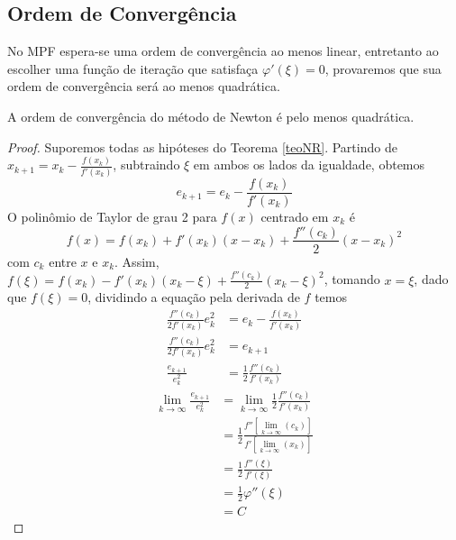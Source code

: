 \subsection{Ordem de Convergência}
No MPF espera-se uma ordem de convergência ao menos linear, entretanto ao escolher uma função de iteração que satisfaça $\varphi'(\xi) = 0$, provaremos que sua ordem de convergência será ao menos quadrática.
\begin{prop}
    A ordem de convergência do método de Newton é pelo menos quadrática.
\end{prop}
\begin{proof}
    Suporemos todas as hipóteses do Teorema \ref{teoNR}. %
    Partindo de $x_{k+1} = x_k - \frac{f(x_k)}{f'(x_k)}$, subtraindo $\xi$ em ambos os lados da igualdade, obtemos
\begin{equation} \label{eMNR}
    e_{k+1} = e_k - \frac{f(x_k)}{f'(x_k)} 
\end{equation}
O polinômio de Taylor de grau 2 para $f(x)$ centrado em $x_k$ é
\begin{equation*}
    f(x) = f(x_k) + f'(x_k)(x - x_k) + \frac{f''(c_k)}{2}(x-x_k)^2
\end{equation*}
com $c_k$ entre $x$ e $x_k$.
Assim, $f(\xi) = f(x_k) - f'(x_k)(x_k - \xi) + \frac{f''(c_k)}{2}(x_k-\xi)^2$,
tomando $x = \xi$, dado que $f(\xi) = 0$, dividindo a equação pela derivada de $f$ temos
\begin{align*}
    \frac{f''(c_k)}{2f'(x_k)}e_k^2 &= e_k - \frac{f(x_k)}{f'(x_k)} \\
    \frac{f''(c_k)}{2f'(x_k)}e_k^2 &= e_{k+1} \\
    \frac{e_{k+1}}{e_k^2} &= \frac{1}{2} \frac{f''(c_k)}{f'(x_k)}
\end{align*}
\begin{align*}
    \lim_{k \to \infty} \frac{e_{k+1}}{e_k^2} &= \lim_{k \to \infty} \frac{1}{2} \frac{f''(c_k)}{f'(x_k)} \\
     &= \frac{1}{2} \frac{f''[\lim_{k \to \infty} (c_k)]}{f'[\lim_{k \to \infty} (x_k)]} \\
     &= \frac{1}{2} \frac{f''(\xi)}{f'(\xi)} \\
     &= \frac{1}{2} \varphi''(\xi) \\
     &= C
\end{align*}
\end{proof}
